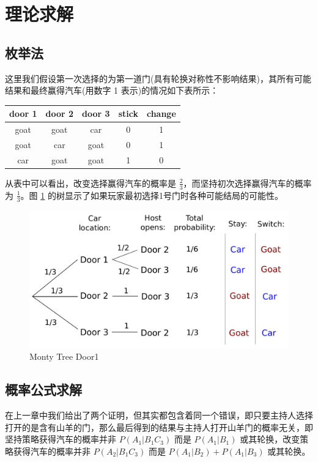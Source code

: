 \section{理论求解}

\subsection{枚举法}

这里我们假设第一次选择的为第一道门(具有轮换对称性不影响结果)，其所有可能结果和最终赢得汽车(用数字 1 表示)的情况如下表所示：

\begin{table}[h]
	\centering
	\begin{tabular}{ccc|cc}
		door 1 & door 2 & door 3 & stick & change \\ \hline
		goat   & goat   & car    & 0     & 1      \\ \hline
		goat   & car    & goat   & 0     & 1      \\ \hline
		car    & goat   & goat   & 1     & 0 
	\end{tabular}
\end{table}

从表中可以看出，改变选择赢得汽车的概率是 $\frac{2}{3}$，而坚持初次选择赢得汽车的概率为 $\frac{1}{3}$。图 \ref{fig:Monty_Tree_Door1} 的树显示了如果玩家最初选择1号门时各种可能结局的可能性。

\begin{figure}[H]
	\centering
	\includegraphics[width=12cm]{figure/tree_door1.jpg}
	\caption{Monty Tree Door1} \label{fig:Monty_Tree_Door1}
\end{figure}

\subsection{概率公式求解}

在上一章中我们给出了两个证明，但其实都包含着同一个错误，即只要主持人选择打开的是含有山羊的门，那么最后得到的结果与主持人打开山羊门的概率无关，即坚持策略获得汽车的概率并非 $P(A_1|B_1C_3)$ 而是 $P(A_1|B_1)$ 或其轮换，改变策略获得汽车的概率并非 $P(A_2|B_1C_3)$ 而是 $P(A_1|B_2)+P(A_1|B_3)$ 或其轮换。

